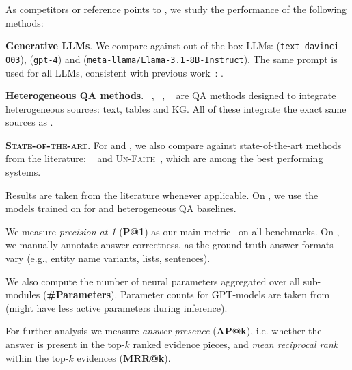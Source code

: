  As competitors or reference points to \method, we study the performance of the following methods:

\squishlist
    \item \textbf{Generative LLMs}.
    We compare \method against out-of-the-box LLMs: \textbf{\gptthree} (\texttt{text-davinci-003}), \textbf{\gptfour} (\texttt{gpt-4}) 
    and \textbf{\llama} (\texttt{meta-llama/Llama-3.1-8B-Instruct}).
    The same prompt is used for all LLMs, consistent with previous work~\cite{Christmann-CompMix:WWW2024, Zhang-Spaghetti:ACL2024}:
    .
    

    \item \textbf{Heterogeneous QA methods}.
    \convinse~\cite{Christmann-CONVINSE:SIGIR2022}, \unikqa~\cite{Oguz-UniK-QA:NAACL2022}, \explaignn~\cite{Christmann-Explaignn:SIGIR2023}
    are QA methods designed to integrate heterogeneous sources: text, tables and KG. All of these  integrate the exact same sources as \method.

    
    \item \textbf{\textsc{State-of-the-art}}.
    For \compmix and \timequestions, we also compare against state-of-the-art methods from the literature: \spaghetti~\cite{Zhang-Spaghetti:ACL2024} and \textsc{Un-Faith}~\cite{Jia-FAITH:WWW2024}, which are among the best performing systems.
    
Results are taken from the literature whenever applicable.
On \crag, we use the models trained on \compmix for \method and heterogeneous QA baselines.
\squishend



We measure \textit{precision at 1} (\textbf{P@1}) as our main metric~\cite{RoyAnand:MC2021} on all benchmarks.
On \crag, we manually annotate answer correctness, as the ground-truth answer formats vary (e.g., entity name variants, lists, sentences).

We also compute the number of neural parameters aggregated over all sub-modules (\textbf{\#Parameters}).
Parameter counts for GPT-models are taken from~\cite{Minaee-LLM-survey}
(\gptfour might have less active parameters during inference).

For further analysis we measure \textit{answer presence} (\textbf{AP@k}),
i.e. whether the answer is present in the top-$k$ ranked evidence pieces,
and \textit{mean reciprocal rank} within the top-$k$ evidences (\textbf{MRR@k}).

